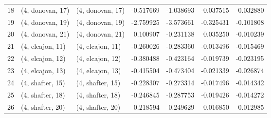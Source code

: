 \begin{tabular}{lllrrrr}
18 &  (4, donovan, 17) &  (4, donovan, 17) & -0.517669 & -1.038693 &  -0.037515 & -0.032880 \\
19 &  (4, donovan, 19) &  (4, donovan, 19) & -2.759925 & -3.573661 &  -0.325431 & -0.101808 \\
20 &  (4, donovan, 21) &  (4, donovan, 21) &  0.100907 & -0.231138 &   0.035250 & -0.010239 \\
21 &  (4, elcajon, 11) &  (4, elcajon, 11) & -0.260026 & -0.283360 &  -0.013496 & -0.015469 \\
22 &  (4, elcajon, 12) &  (4, elcajon, 12) & -0.380488 & -0.423164 &  -0.019739 & -0.023195 \\
23 &  (4, elcajon, 13) &  (4, elcajon, 13) & -0.415504 & -0.473404 &  -0.021339 & -0.026874 \\
24 &  (4, shafter, 15) &  (4, shafter, 15) & -0.228307 & -0.273314 &  -0.017496 & -0.014342 \\
25 &  (4, shafter, 18) &  (4, shafter, 18) & -0.246845 & -0.287753 &  -0.019426 & -0.014272 \\
26 &  (4, shafter, 20) &  (4, shafter, 20) & -0.218594 & -0.249629 &  -0.016850 & -0.012985 \\
\bottomrule
\end{tabular}

